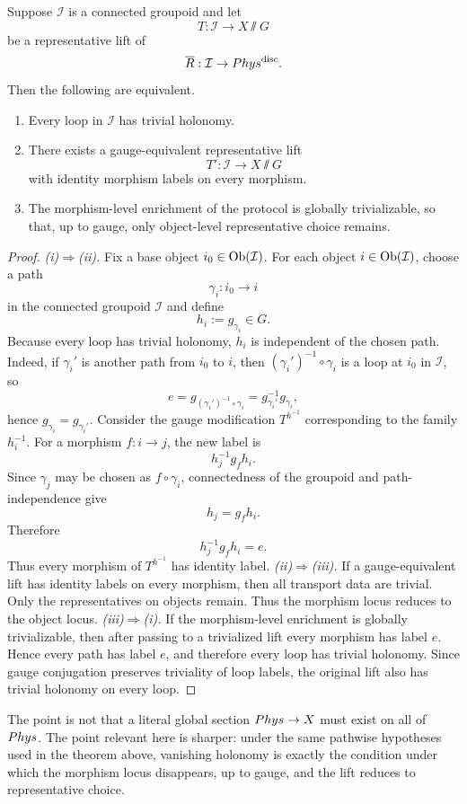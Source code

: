\begin{theorem}
	Suppose \(\mathcal I\) is a connected groupoid and let
	\[
		T:\mathcal I\to X\sslash G
	\]
	be a representative lift of
	\[
		\overline R:\mathcal I\to Phys^{\mathrm{disc}}.
	\]
	Then the following are equivalent.
	\begin{enumerate}[label=\textup{(\roman*)}]
		\item Every loop in \(\mathcal I\) has trivial holonomy.
		\item There exists a gauge-equivalent representative lift
		      \[
			      T':\mathcal I\to X\sslash G
		      \]
		      with identity morphism labels on every morphism.
		\item The morphism-level enrichment of the protocol is globally
		      trivializable, so that, up to gauge, only object-level representative
		      choice remains.
	\end{enumerate}
\end{theorem}
\begin{proof}
	\emph{\textup{(i)}\(\Rightarrow\)\textup{(ii)}.}
	Fix a base object \(i_0\in\operatorname{Ob}(\mathcal I)\).  For each object
	\(i\in\operatorname{Ob}(\mathcal I)\), choose a path
	\[
		\gamma_i:i_0\to i
	\]
	in the connected groupoid \(\mathcal I\) and define
	\[
		h_i:=g_{\gamma_i}\in G.
	\]
	Because every loop has trivial holonomy, \(h_i\) is independent of the
	chosen path.  Indeed, if \(\gamma_i'\) is another path from \(i_0\) to
	\(i\), then \((\gamma_i')^{-1}\circ\gamma_i\) is a loop at \(i_0\) in
	\(\mathcal I\), so
	\[
		e
		=
		g_{(\gamma_i')^{-1}\circ\gamma_i}
		=
		g_{\gamma_i'}^{-1}g_{\gamma_i},
	\]
	hence \(g_{\gamma_i}=g_{\gamma_i'}\).
	Consider the gauge modification \(T^{h^{-1}}\) corresponding to the
	family \(h_i^{-1}\).  For a morphism \(f:i\to j\), the new label is
	\[
		h_j^{-1}g_f h_i.
	\]
	Since \(\gamma_j\) may be chosen as \(f\circ\gamma_i\), connectedness
	of the groupoid and path-independence give
	\[
		h_j=g_f h_i.
	\]
	Therefore
	\[
		h_j^{-1}g_f h_i=e.
	\]
	Thus every morphism of \(T^{h^{-1}}\) has identity label.
	\smallskip
	\noindent\emph{\textup{(ii)}\(\Rightarrow\)\textup{(iii)}.}
	If a gauge-equivalent lift has identity labels on every morphism, then
	all transport data are trivial.  Only the representatives on objects
	remain.  Thus the morphism locus reduces to the object locus.
	\smallskip
	\noindent\emph{\textup{(iii)}\(\Rightarrow\)\textup{(i)}.}
	If the morphism-level enrichment is globally trivializable, then after
	passing to a trivialized lift every morphism has label \(e\).  Hence
	every path has label \(e\), and therefore every loop has trivial
	holonomy.  Since gauge conjugation preserves triviality of loop labels,
	the original lift also has trivial holonomy on every loop.
\end{proof}
\begin{remark}
	The point is not that a literal global section \(Phys\to X\) must
	exist on all of \(Phys\).  The point relevant here is sharper: under
	the same pathwise hypotheses used in the theorem above, vanishing
	holonomy is exactly the condition under which the morphism locus
	disappears, up to gauge, and the lift reduces to representative
	choice.
\end{remark}

